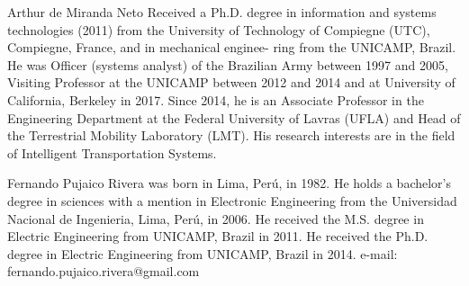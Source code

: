 \documentclass[letterpaper, 10 pt,conference]{ieeeconf}  %
\begin{document}
\begin{biography}{Arthur de Miranda Neto}
 Received a Ph.D. degree
in information and systems technologies (2011) from
the University of Technology of Compiegne (UTC),
Compiegne, France, and in mechanical enginee-
ring from the UNICAMP, Brazil. He was Officer
(systems analyst) of the Brazilian Army between
1997 and 2005, Visiting Professor at the UNICAMP
between 2012 and 2014 and at University of California, 
Berkeley in 2017. Since 2014, he is an
Associate Professor in the Engineering Department
at the Federal University of Lavras (UFLA) and
Head of the Terrestrial Mobility Laboratory (LMT). His research interests
are in the field of Intelligent Transportation Systems.
\end{biography}



\begin{biography}{Fernando Pujaico Rivera}
was born in Lima, Perú, in 1982. 
He holds a
bachelor’s degree in sciences with a mention in Electronic Engineering from the
Universidad Nacional de Ingenieria, Lima, Perú, in 2006. 
He received the M.S. degree in Electric Engineering from UNICAMP, Brazil in 2011. 
He received the Ph.D. degree in Electric Engineering from UNICAMP, Brazil in 2014. 
e-mail: fernando.pujaico.rivera@gmail.com
\end{biography}
\end{document}
